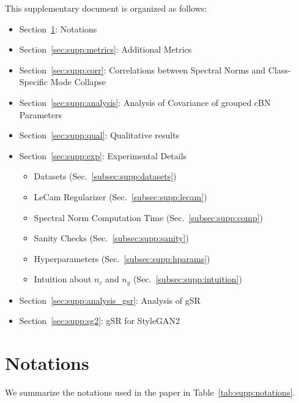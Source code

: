 \documentclass[runningheads,table]{llncs}
\begin{document}
This supplementary document is organized as follows:
\begin{itemize}
\setlength{\itemindent}{-0mm}
    \item Section~\ref{sec:supp:notations}: Notations
    \item Section~\ref{sec:supp:metrics}: Additional Metrics
    \item Section~\ref{sec:supp:corr}: Correlations between Spectral Norms and
Class-Specific Mode Collapse
    \item Section~\ref{sec:supp:analysis}: Analysis of Covariance of grouped cBN Parameters
    \item Section~\ref{sec:supp:qual}: Qualitative results
    \item Section~\ref{sec:supp:exp}: Experimental Details
    \begin{itemize}
        \item Datasets (Sec.~\ref{subsec:supp:datasets})
        \item LeCam Regularizer (Sec.~\ref{subsec:supp:lecam})
        \item Spectral Norm Computation Time (Sec.~\ref{subsec:supp:comp})
        \item Sanity Checks (Sec.~\ref{subsec:supp:sanity})
        \item Hyperparameters (Sec.~\ref{subsec:supp:hparams})
        \item Intuition about $n_c$ and $n_g$ (Sec.~\ref{subsec:supp:intuition})
    \end{itemize}
    \item Section~\ref{sec:supp:analysis_gsr}: Analysis of gSR
    \item Section~\ref{sec:supp:sg2}: gSR for StyleGAN2
\end{itemize}{}






\section{Notations}
\label{sec:supp:notations}
\noindent We summarize the notations used in the paper in Table~\ref{tab:supp:notations}.
\end{document}

